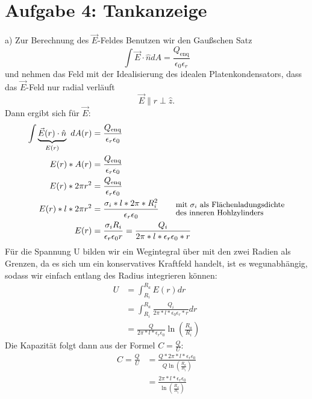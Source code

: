 \documentclass[11pt a4paper]{article}
\newcommand{\epsz}{\epsilon_0}
\begin{document}
\section*{Aufgabe 4: Tankanzeige}
\par{a)}
Zur Berechnung des $\vec E$-Feldes Benutzen wir den Gaußschen Satz
\[ \int \vec E \cdot \hat n dA = \frac{Q_\text{enq}}{\epsz\epsilon_r} \]
und nehmen das Feld mit der Idealisierung des idealen Platenkondensators,
dass das $\vec E$-Feld nur radial verläuft
\[ \vec E \parallel \hat r \perp \hat z. \]
Dann ergibt sich für $\vec E$:
\begin{align*}
	\int \underbrace{\vec E(r) \cdot \hat n}_{E(r)}	\ dA(r) 
	&= \frac{Q_\text{enq}}{\epsilon_r \epsz} \\
	E(r) * A(r) &= \frac{Q_\text{enq}}{\epsilon_r \epsz} \\
	E(r) * 2\pi r^2 &= \frac{Q_\text{enq}}{\epsilon_r \epsz} \\
	E(r) * l * 2\pi r^2 &= \frac{\sigma_i * l * 2\pi * R_i^2}
	{\epsilon_r \epsz}
	\qquad ^{\text{\small mit $\sigma_i$ als Flächenladungsdichte}}
	_{\text{\small des inneren Hohlzylinders}} \\
	E(r) &= \frac{\sigma_i R_i}{\epsilon_r \epsz r} 
	= \frac{Q_i}{2\pi * l * \epsilon_r \epsz * r}
\end{align*}
Für die Spannung U bilden wir ein Wegintegral über mit den zwei Radien als 
Grenzen, da es sich um ein konservatives Kraftfeld handelt, ist es 
wegunabhängig, sodass wir einfach entlang des Radius integrieren können:
\begin{align*}
	U &= \int_{R_i}^{R_a} E(r) dr \\
	&= \int_{R_i}^{R_a} \frac{Q_i}{2\pi * l * \epsz \epsilon_r* r} dr \\
	&= \frac{Q}{2\pi * l * \epsilon_r \epsz} \ln\left(\frac{R_a}{R_i}
	\right)
\end{align*}
Die Kapazität folgt dann aus der Formel $C = \frac QU$:
\begin{align*}
	C = \frac QU &= \frac{Q * 2\pi * l * \epsilon_r \epsz}
	{Q \ln\left(\frac{R_a}{R_i}\right)} \\
	&= \frac{2\pi * l * \epsilon_r \epsz}
	{\ln\left(\frac{R_a}{R_i}\right)} 
\end{align*}
\end{document}
